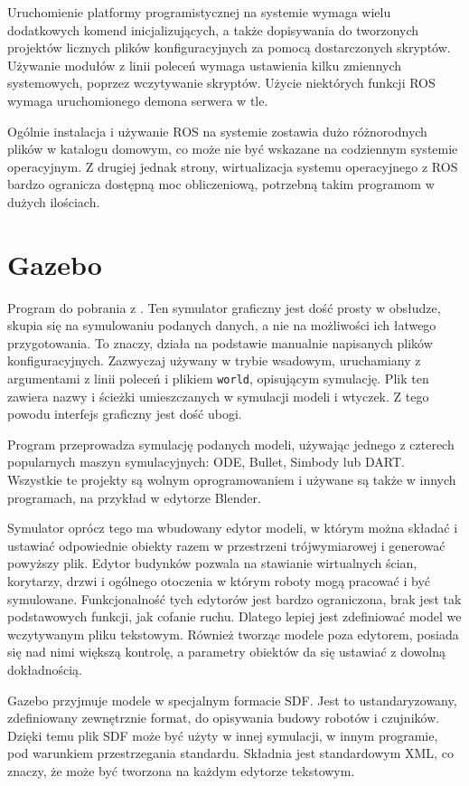 	Uruchomienie platformy programistycznej na systemie wymaga wielu dodatkowych komend inicjalizujących, 
	a także dopisywania do tworzonych projektów licznych plików konfiguracyjnych za pomocą dostarczonych skryptów.
	Używanie modułów z linii poleceń wymaga ustawienia kilku zmiennych systemowych, poprzez wczytywanie skryptów.
	Użycie niektórych funkcji ROS wymaga uruchomionego demona serwera w tle.

	Ogólnie instalacja i używanie ROS na systemie zostawia dużo różnorodnych plików w katalogu domowym, co może nie być wskazane na codziennym systemie operacyjnym.
	Z drugiej jednak strony, wirtualizacja systemu operacyjnego z ROS bardzo ogranicza dostępną moc obliczeniową, potrzebną takim programom w dużych ilościach.

\section{Gazebo}
	Program do pobrania z \cite{gazebo_website}. 
	Ten symulator graficzny jest dość prosty w obsłudze, skupia się na symulowaniu podanych danych, a nie na możliwości ich łatwego przygotowania.
	To znaczy, działa na podstawie manualnie napisanych plików konfiguracyjnych.
	Zazwyczaj używany w trybie wsadowym, uruchamiany z argumentami z linii poleceń i plikiem \texttt{world}, opisującym symulację.
	Plik ten zawiera nazwy i ścieżki umieszczanych w symulacji modeli i wtyczek.
	Z tego powodu interfejs graficzny jest dość ubogi.

	Program przeprowadza symulację podanych modeli, używając jednego z czterech popularnych maszyn symulacyjnych: ODE, Bullet, Simbody lub DART.
	Wszystkie te projekty są wolnym oprogramowaniem i używane są także w innych programach, na przykład w edytorze Blender.

	Symulator oprócz tego ma wbudowany edytor modeli, w którym można składać i ustawiać odpowiednie obiekty razem w przestrzeni trójwymiarowej
	i generować powyższy plik.
	Edytor budynków pozwala na stawianie wirtualnych ścian, korytarzy, drzwi i ogólnego otoczenia w którym roboty mogą pracować i być symulowane.
	Funkcjonalność tych edytorów jest bardzo ograniczona, brak jest tak podstawowych funkcji, jak cofanie ruchu.
	Dlatego lepiej jest zdefiniować model we wczytywanym pliku tekstowym.
	Również tworząc modele poza edytorem, posiada się nad nimi większą kontrolę, a parametry obiektów da się ustawiać z dowolną dokładnością.

	Gazebo przyjmuje modele w specjalnym formacie SDF. Jest to ustandaryzowany, zdefiniowany zewnętrznie format, do opisywania budowy robotów i czujników.
	Dzięki temu plik SDF może być użyty w innej symulacji, w innym programie, pod warunkiem przestrzegania standardu.
	Składnia jest standardowym XML, co znaczy, że może być tworzona na każdym edytorze tekstowym.

